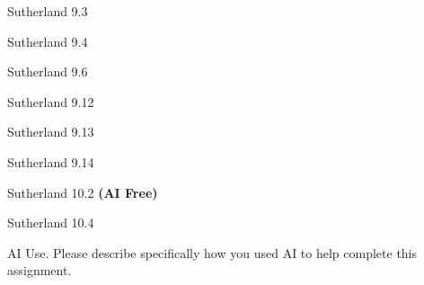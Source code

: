 \documentclass[minion]{homework}
\begin{document}
\begin{problems}

\problem Sutherland 9.3

\problem Sutherland 9.4

\problem Sutherland 9.6

\problem Sutherland 9.12

\problem Sutherland 9.13

\problem Sutherland 9.14

\problem Sutherland 10.2 \textbf{(AI Free)}

\problem Sutherland 10.4

\problem AI Use. Please describe specifically how you used AI to help complete this assignment.

\end{problems}
\end{document}
